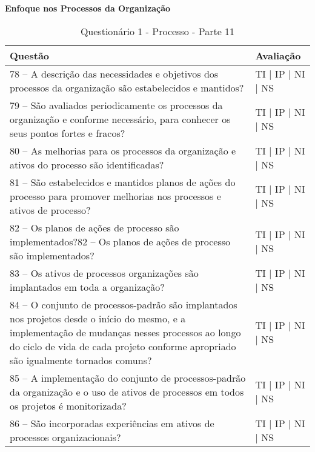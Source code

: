 \documentclass[openany,10pt,a4paper]{article}
\begin{document}
\begin{longtable}
\begin{appendix}
\begin{table}[h]
\textbf{Enfoque nos Processos da Organização}
	\centering
	\caption{Questionário 1 - Processo - Parte 11}
	\begin{tabular}{p{3.5in}p{2in}}		
		\toprule
		\textbf{Questão}  & \textbf{Avaliação}\\ 
		\midrule
		78 – A descrição das necessidades e objetivos dos processos da organização são estabelecidos e 
mantidos?
 & TI | IP | NI | NS \\
        \midrule
		79 – São avaliados periodicamente os processos da organização e conforme necessário, para 
conhecer os seus pontos fortes e fracos?
 & TI | IP | NI | NS \\
		\midrule
		80 – As melhorias para os processos da organização e ativos do processo são identificadas?
 & TI | IP | NI | NS \\
		\midrule
        81 – São estabelecidos e mantidos planos de ações do processo para promover melhorias nos 
processos e ativos de processo?
 & TI | IP | NI | NS \\
		\midrule
		82 – Os planos de ações de processo são implementados?82 – Os planos de ações de processo são implementados?
  & TI | IP | NI | NS \\
		\midrule
		83 – Os ativos de processos organizações são implantados em toda a organização?
 & TI | IP | NI | NS \\
        \midrule
		84 – O conjunto de processos-padrão são implantados nos projetos desde o início do mesmo, e 
a implementação de mudanças nesses processos ao longo do ciclo de vida de cada projeto
conforme apropriado são igualmente tornados comuns? 
 & TI | IP | NI | NS \\
 \midrule
		85 – A implementação do conjunto de processos-padrão da organização e o uso de ativos de
processos em todos os projetos é monitorizada? 
 & TI | IP | NI | NS \\\midrule
		86 – São incorporadas experiências em ativos de processos organizacionais?
 & TI | IP | NI | NS \\
		\bottomrule
	\end{tabular} 
	\label{tab:tabela1}
\end{table}


\end{appendix}
\end{longtable}
\end{document}

